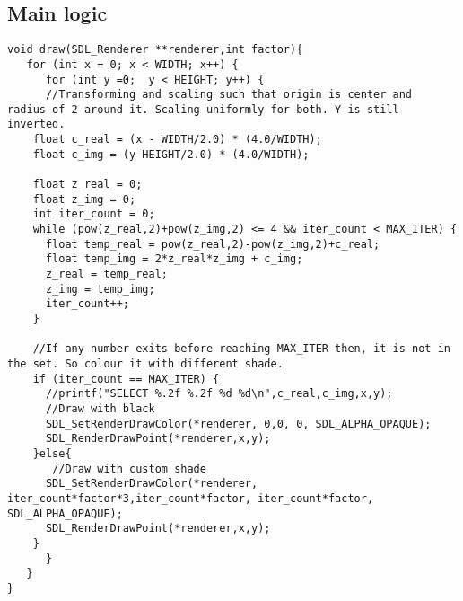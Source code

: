 \documentclass[a4paper,11pt]{article}
\begin{document}
\subsection{Main logic}
\label{sec:org6e5ecd8}
\begin{verbatim}
void draw(SDL_Renderer **renderer,int factor){
   for (int x = 0; x < WIDTH; x++) {
      for (int y =0;  y < HEIGHT; y++) {
      //Transforming and scaling such that origin is center and  radius of 2 around it. Scaling uniformly for both. Y is still inverted.
	float c_real = (x - WIDTH/2.0) * (4.0/WIDTH); 
	float c_img = (y-HEIGHT/2.0) * (4.0/WIDTH); 

	float z_real = 0;
	float z_img = 0;
	int iter_count = 0;
	while (pow(z_real,2)+pow(z_img,2) <= 4 && iter_count < MAX_ITER) {
	  float temp_real = pow(z_real,2)-pow(z_img,2)+c_real;
	  float temp_img = 2*z_real*z_img + c_img;
	  z_real = temp_real;
	  z_img = temp_img;
	  iter_count++;
	}

	//If any number exits before reaching MAX_ITER then, it is not in the set. So colour it with different shade.
	if (iter_count == MAX_ITER) {
	  //printf("SELECT %.2f %.2f %d %d\n",c_real,c_img,x,y);
	  //Draw with black
	  SDL_SetRenderDrawColor(*renderer, 0,0, 0, SDL_ALPHA_OPAQUE);
	  SDL_RenderDrawPoint(*renderer,x,y);
	}else{
	   //Draw with custom shade
	  SDL_SetRenderDrawColor(*renderer, iter_count*factor*3,iter_count*factor, iter_count*factor, SDL_ALPHA_OPAQUE);
	  SDL_RenderDrawPoint(*renderer,x,y);
	}
      }
   }
}


\end{verbatim}
\end{document}
